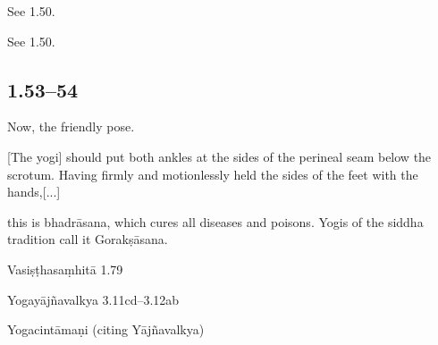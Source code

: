 \begin{ekdosis}
\begin{testimonia}[hp01_052]
See 1.50.
\end{testimonia}

\begin{philcomm}[hp01_052]
See 1.50.
\end{philcomm}

\subsection*{1.53--54}
\begin{translation}[hp01_053]
Now, the friendly pose.

[The yogi] should put both ankles at the sides of the perineal seam below the scrotum.  Having firmly and motionlessly held the sides of the feet with the hands,[...]
\end{translation}

\begin{translation}[hp01_054]
[...] this is bhadrāsana, which cures all diseases and poisons. Yogis of the siddha tradition call it Gorakṣāsana.
\end{translation}

\begin{sources}[hp01_053]
Vasiṣṭhasaṃhitā 1.79

\begin{versinnote}
\end{versinnote}

Yogayājñavalkya 3.11cd--3.12ab

\begin{versinnote}
\end{versinnote}

\end{sources}

\begin{testimonia}[hp01_053]
Yogacintāmaṇi (citing Yājñavalkya)

\begin{versinnote}
\end{versinnote}


\end{testimonia}
\end{ekdosis}
